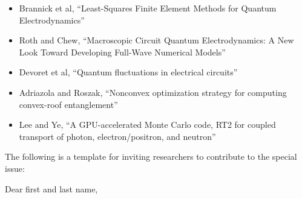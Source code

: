 \documentclass[]{article}
\begin{document}
\begin{itemize}
\item Brannick et al, ``Least-Squares Finite Element Methods for Quantum Electrodynamics''
\item Roth and Chew, ``Macroscopic Circuit Quantum Electrodynamics: A New Look Toward Developing Full-Wave Numerical Models''
\item Devoret et al, ``Quantum fluctuations in electrical circuits''
\item Adriazola and Roszak, ``Nonconvex optimization strategy for computing convex-roof entanglement''
\item Lee and Ye\cite{lee2024gpu}, ``A GPU-accelerated Monte Carlo code, RT2 for coupled transport of photon, electron/positron, and neutron''
\end{itemize}

\begin{comment}

Indicates the timeframe in which the special issue could be produced (to include paper writing, reviewing and submission of final copy to the journal) assuming the proposal is accepted;
Includes a short biography of all authors and guest editors;
Indicates any special timing, associated events, funding support, partnerships or other links or relationships which could influence the development of the issue;
Provides any further information which you feel is relevant.
A special issue normally contains between five and 20 full-length articles, in addition to an editorial written by the special issue organizers. Because it is highly unlikely that all articles submitted for potential inclusion in a special issue will successfully pass the peer review process, it is wise to consider more papers than you anticipate as the upper limit. If fewer than three articles are accepted for publication, the articles will be published as stand-alone articles in the journal.
Once you're ready, use the link below to find your chosen journal and submit your proposal.

https://www.elsevier.com/editor/role/guest/guide

\end{comment}

The following is a template for inviting researchers to contribute to the special issue: \\
\par\noindent
Dear first and last name, \\
\par\noindent
\end{document}
